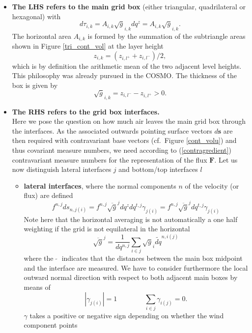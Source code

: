 \begin{itemize}
 \item {\bf The LHS refers to the main grid box} (either triangular, quadrilateral or hexagonal) with
 $$d\tau_{i,k} = A_{i,k}\sqrt{g}_{i,k}dq^z=A_{i,k}\sqrt{g}_{i,k}.$$ The horizontal area $A_{i,k}$
 is formed by the summation of the subtriangle areas shown in Figure \ref{tri_cont_vol} at the layer
 height
 $$z_{i,k}=({z_{i,l^+}+z_{i,l^-}})/2,$$ which is by definition the arithmetic mean of the two adjacent
 level heights. This philosophy was already pursued in the COSMO. The thickness of the box is given by
 $$\sqrt{g}_{i,k}=z_{i,l^-}-z_{i,l^+}>0.$$
 \item {\bf The RHS refers to the grid box interfaces.}\\
Here we pose the question on how much air leaves the main grid box through the interfaces.
As the associated outwards pointing surface vectors $d\mathbf{s}$ are then required with contravariant base vectors (cf.~Figure \ref{cont_volu}) and thus covariant measure numbers, we need according to (\ref{contragredient}) contravariant measure numbers for the representation of the flux $\mathbf{F}$.
Let us now distinguish lateral interfaces $j$ and bottom/top interfaces $l$
 \begin{itemize}
   \item {\bf lateral interfaces}, where the normal components $n$ of the velocity (or flux) are defined
         \begin{displaymath}
         f^{n,j}ds_{n,j(i)} = f^{n,j}\overline{\sqrt{g}}^jdq^zdq^{t,j}\gamma_{j(i)}=
                              f^{n,j}\overline{\sqrt{g}}^jdq^{t,j}\gamma_{j(i)}
         \end{displaymath}
         Note here that the horizontal averaging is not automatically a one half weighting if the grid is
         not equilateral in the horizontal
         \begin{displaymath}
         \overline{\sqrt{g}}^j=\frac{1}{dq^{n,j}}\sum_{i\in j}\sqrt{g}_i
                                   \widetilde{dq}^{n,i(j)}
         \end{displaymath}
         where the $\widetilde{\;\;}$ indicates that the distances between the main box midpoint and the
         interface are measured.
         We have to consider furthermore the local outward
         normal direction with respect to both adjacent main boxes by means of 
         $$|\gamma_{j(i)}|=1\qquad\qquad \sum_{i\in j}\gamma_{i(j)}=0.$$
         $\gamma$ takes a positive or negative sign depending on whether the wind component points

\end{itemize}
\end{itemize}
